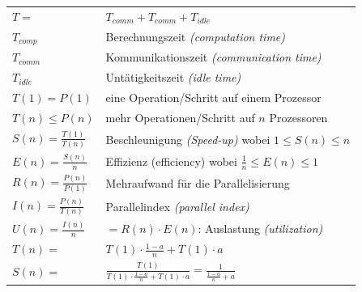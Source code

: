 \documentclass[9pt,a4paper]{scrartcl}
\begin{document}
\begin{multicols}{2}
\begin{tabular}{ll}
$T=$ & $T_{comm}+T_{comm}+T_{idle}$\\
$T_{comp}$ & Berechnungszeit \emph{(computation time)}\\
$T_{comm}$ & Kommunikationszeit \emph{(communication time)}\\
$T_{idle}$ & Untätigkeitszeit \emph{(idle time)}\\
$T(1) = P(1)$ &  eine Operation/Schritt auf einem Prozessor\\
$T(n) \leq P(n)$ & mehr Operationen/Schritt auf $n$ Prozessoren\\
$S(n)=\frac{T(1)}{T(n)}$ & Beschleunigung \emph{(Speed-up)} wobei $1 \leq S(n)\leq n$\\
$E(n)=\frac{S(n)}{n}$ & Effizienz (efficiency) wobei $\frac{1}{n}\leq E(n) \leq 1$\\
$R(n)=\frac{P(n)}{P(1)}$ & Mehraufwand für die Parallelisierung\\
$I(n)=\frac{P(n)}{T(n)}$ & Parallelindex \emph{(parallel index)}\\
$U(n)=\frac{I(n)}{n}$ & $=R(n)\cdot E(n)$: Auslastung \emph{(utilization)} \\
$T(n)=$ & $T(1)\cdot\frac{1-a}{n}+T(1) \cdot a$\\
$S(n)=$ & $\frac{T(1)}{T(1)\cdot \frac{1-a}{n} + T(1) \cdot a}=\frac{1}{\frac{1-a}{n}+a}$\\
\end{tabular}

\end{multicols}
\end{document}

